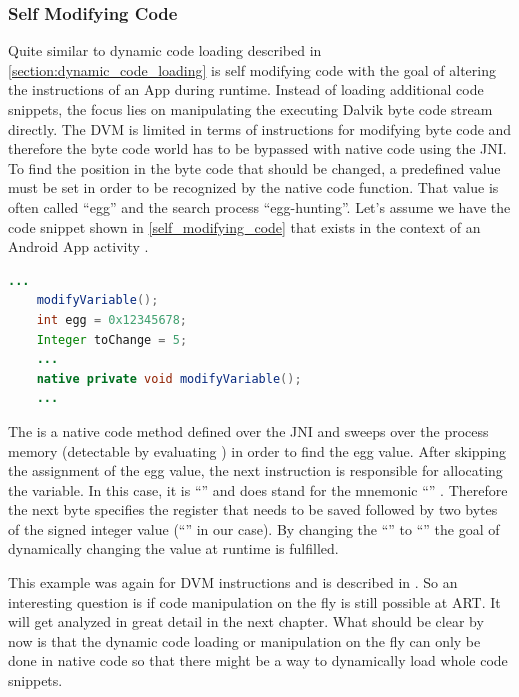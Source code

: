 \subsubsection{Self Modifying Code}
Quite similar to dynamic code loading described in
\autoref{section:dynamic_code_loading} is self modifying code with the goal
of altering the instructions of an App during runtime.
Instead of loading additional code snippets, the focus lies on
manipulating the executing Dalvik byte code stream directly.
The DVM is limited in terms of instructions for modifying byte code
and therefore the byte code world has to be bypassed with native code using the JNI. To find the position in the byte code that should be changed, a predefined
value must be set in order to be recognized by the native code function.
That value is often called ``egg'' and the search process ``egg-hunting''.
Let's assume we have the code snippet shown in \autoref{self_modifying_code} that exists in the context of an Android App activity
\parencite{code_protection}.
 \begin{lstlisting}[language=Java, caption=Self Modifying Code Example, label=self_modifying_code]
    ...
    modifyVariable();
    int egg = 0x12345678;
    Integer toChange = 5;
    ...
    native private void modifyVariable();
    ...
\end{lstlisting}

The  is a native code method defined over the JNI
and sweeps over the process memory (detectable by evaluating
)
in order to find the egg value. After skipping the assignment of
the egg value, the next instruction is responsible for allocating
the  variable. In this case, it is ``''
and does stand for the mnemonic ``''
\parencite{bytecode_format}. Therefore the next byte specifies the
register that needs to be saved followed by two bytes of the signed integer value (``'' in our case). By changing the ``'' to
``'' the goal of dynamically changing the value at runtime
is fulfilled.

This example was again for DVM instructions and is described in \parencite{code_protection}. So an interesting question is if code manipulation on the fly
is still possible at ART. It will get analyzed in great detail in the next chapter. What should be clear by now is that the dynamic code loading or manipulation on the
fly can only be done in native code so that there might be a way to dynamically
load whole code snippets.
